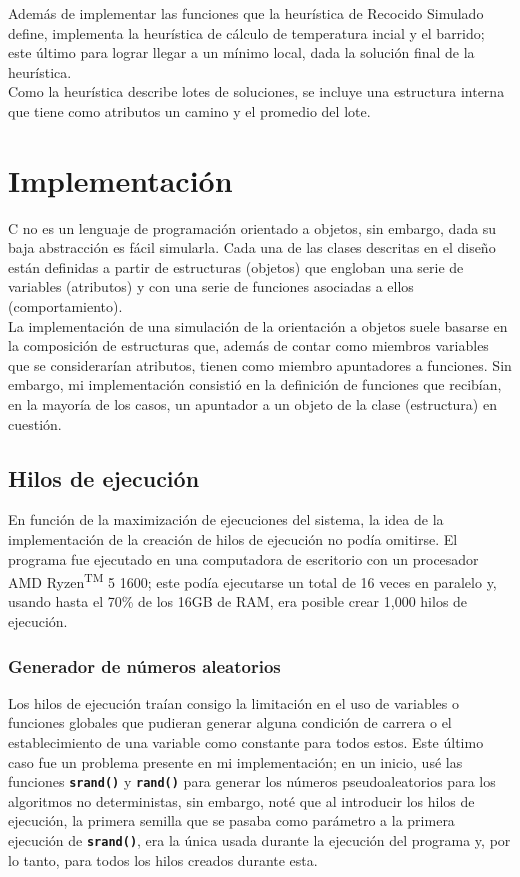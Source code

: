 \documentclass[a4paper]{report}
\begin{document}
Adem\'as de implementar las funciones que la heur\'istica de Recocido Simulado define, implementa la
heur\'istica de c\'alculo de temperatura incial y el barrido; este \'ultimo para lograr llegar
a un m\'inimo local, dada la soluci\'on final de la heur\'istica.\\

Como la heur\'istica describe lotes de soluciones, se incluye una estructura interna que tiene como
atributos un camino y el promedio del lote.\\

\chapter{Implementaci\'on}
C no es un lenguaje de programaci\'on orientado a objetos, sin embargo, dada su baja abstracci\'on
es f\'acil simularla. Cada una de las clases descritas en el dise\~no est\'an definidas a partir de
estructuras (objetos) que engloban una serie de variables (atributos) y con una serie de funciones
asociadas a ellos (comportamiento).\\

La implementaci\'on de una simulaci\'on de la orientaci\'on a objetos suele basarse en la composici\'on
de estructuras que, adem\'as de contar como miembros variables que se considerar\'ian atributos,
tienen como miembro apuntadores a funciones. Sin embargo, mi implementaci\'on consisti\'o en la definici\'on
de funciones que recib\'ian, en la mayor\'ia de los casos, un apuntador a un objeto de la clase (estructura)
en cuesti\'on.\\

\section{Hilos de ejecuci\'on}
En funci\'on de la maximizaci\'on de ejecuciones del sistema, la idea de la implementaci\'on de la creaci\'on
de hilos de ejecuci\'on no pod\'ia omitirse. El programa fue ejecutado en una computadora de escritorio
con un procesador AMD Ryzen\textsuperscript{TM} 5 1600; este pod\'ia ejecutarse un total de 16 veces
en paralelo y, usando hasta el 70\% de los 16GB de RAM, era posible crear 1,000 hilos de ejecuci\'on.

\subsection{Generador de n\'umeros aleatorios}
Los hilos de ejecuci\'on tra\'ian consigo la limitaci\'on en el uso de variables o funciones globales
que pudieran generar alguna condici\'on de carrera o el establecimiento de una variable como constante
para todos estos. Este \'ultimo caso fue un problema presente en mi implementaci\'on;
en un inicio, us\'e las funciones \textbf{\texttt{srand()}} y \textbf{\texttt{rand()}} para generar
los n\'umeros pseudoaleatorios para los algoritmos no deterministas, sin embargo, not\'e que al introducir
los hilos de ejecuci\'on, la primera semilla que se pasaba como par\'ametro a la primera ejecuci\'on
de \textbf{\texttt{srand()}}, era la \'unica usada durante la ejecuci\'on del programa y, por lo tanto,
para todos los hilos creados durante esta.\\
\end{document}
